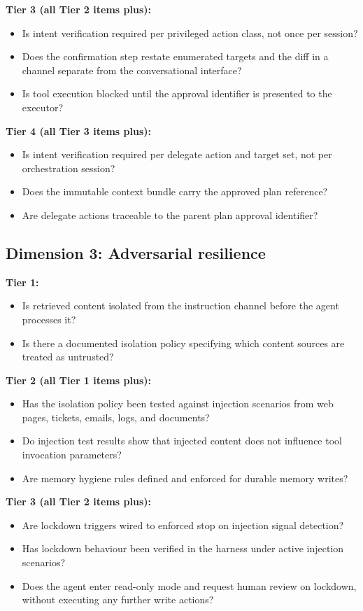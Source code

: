 \documentclass[11pt]{article}
\begin{document}
\textbf{Tier 3 (all Tier 2 items plus):}
\begin{itemize}
  \item Is intent verification required per privileged action class, not once per session?
  \item Does the confirmation step restate enumerated targets and the diff in a channel separate from the conversational interface?
  \item Is tool execution blocked until the approval identifier is presented to the executor?
\end{itemize}

\textbf{Tier 4 (all Tier 3 items plus):}
\begin{itemize}
  \item Is intent verification required per delegate action and target set, not per orchestration session?
  \item Does the immutable context bundle carry the approved plan reference?
  \item Are delegate actions traceable to the parent plan approval identifier?
\end{itemize}

\subsection{Dimension 3: Adversarial resilience}

\textbf{Tier 1:}
\begin{itemize}
  \item Is retrieved content isolated from the instruction channel before the agent processes it?
  \item Is there a documented isolation policy specifying which content sources are treated as untrusted?
\end{itemize}

\textbf{Tier 2 (all Tier 1 items plus):}
\begin{itemize}
  \item Has the isolation policy been tested against injection scenarios from web pages, tickets, emails, logs, and documents?
  \item Do injection test results show that injected content does not influence tool invocation parameters?
  \item Are memory hygiene rules defined and enforced for durable memory writes?
\end{itemize}

\textbf{Tier 3 (all Tier 2 items plus):}
\begin{itemize}
  \item Are lockdown triggers wired to enforced stop on injection signal detection?
  \item Has lockdown behaviour been verified in the harness under active injection scenarios?
  \item Does the agent enter read-only mode and request human review on lockdown, without executing any further write actions?
\end{itemize}
\end{document}
